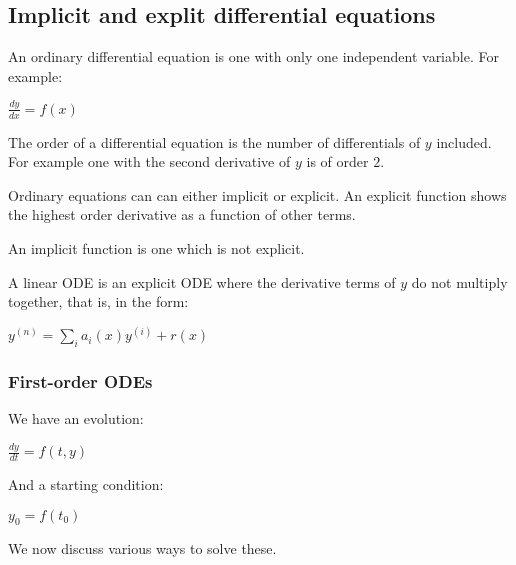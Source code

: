 
\subsection{Implicit and explit differential equations}

An ordinary differential equation is one with only one independent variable. For example:

\(\frac{dy}{dx}=f(x)\)

The order of a differential equation is the number of differentials of \(y\) included. For example one with the second derivative of \(y\) is of order \(2\).

Ordinary equations can can either implicit or explicit. An explicit function shows the highest order derivative as a function of other terms.

An implicit function is one which is not explicit.

A linear ODE is an explicit ODE where the derivative terms of \(y\) do not multiply together, that is, in the form:

\(y^{(n)}=\sum_ia_i(x)y^{(i)}+r(x)\)

\subsubsection{First-order ODEs}

We have an evolution:

\(\frac{dy}{dt}=f(t,y)\)

And a starting condition:

\(y_0=f(t_0)\)

We now discuss various ways to solve these.

